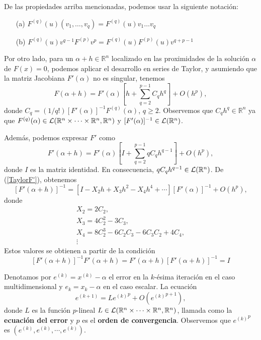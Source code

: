 De las propiedades arriba mencionadas, podemos usar la siguiente notación:
\begin{itemize}
	\item [(a)]  $F^{(q)}(u)(v_1,\ldots,v_{q})=F^{(q)}(u)v_1 \ldots v_{q}$
	\item [(b)]  $F^{(q)}(u)v^{q-1}F^{(p)}v^p=F^{(q)}(u)F^{(p)}(u)v^{q+p-1}$
\end{itemize}

Por otro lado, para un $\alpha+h \in \mathbb{R}^{n}$ localizado en las proximidades de la solución $\alpha$ de $F(x)=0$, podemos aplicar el desarrollo en series de Taylor, y asumiendo que la matriz Jacobiana $F'(\alpha)$ no es singular, tenemos
\begin{equation} \label{taylorconceptosprevios}
F(\alpha+h)=F'(\alpha)\left[h + \sum_{q=2}^{p-1}C_qh^q \right] + O(h^p),
\end{equation}
donde $C_q=(1/q!)[F'(\alpha)]^{-1}F^{(q)}(\alpha)$, $q \geq 2$. Observemos que
$C_qh^q \in \mathbb{R}^{n}$ ya que $F^{(q)}(\alpha) \in {\cal L}(\mathbb{R}^{n} \times
\cdots \times \mathbb{R}^{n}, \mathbb{R}^{n})$ y
$[F'(\alpha)]^{-1} \in {\cal L}(\mathbb{R}^{n})$.

Además, podemos expresar $F'$ como
\begin{equation} \label{TaylorF'}
F'(\alpha+h)=F'(\alpha)\left[I + \sum_{q=2}^{p-1}qC_qh^{q-1} \right] + O(h^p),
\end{equation}
donde $I$ es la matriz identidad. En consecuencia, $qC_qh^{q-1} \in {\cal L}(\mathbb{R}^{n})$.
De (\ref{TaylorF'}), obtenemos
\begin{equation} \label{inverseF'}
[F'(\alpha+h)]^{-1}=\left[I -X_2h+X_3h^2-X_4h^4+ \cdots \right][F'(\alpha)]^{-1} + O(h^p),
\end{equation}
donde
\[
\begin{array} {l}
X_2=2C_2, \\
X_3=4C_2^2-3C_3, \\
X_4=8C_2^3-6C_2C_3-6C_3C_2+4C_4, \\
\vdots
\end{array}
\]
Estos valores se obtienen a partir de la condición
\[
\left[F'(\alpha + h)\right]^{-1}F'(\alpha + h)=F'(\alpha + h)\left[F'(\alpha + h)\right]^{-1}=I
\]

Denotamos por $e^{(k)}=x^{(k)}-\alpha$ el error en la $k$-ésima iteración en el caso multidimensional y $e_k=x_k-\alpha$ en el caso escalar. La ecuación
\[
e^{(k+1)}=L {e^{(k)}}^p+O({e^{(k)}}^{p+1}),
\]
donde $L$ es la función $p$-lineal
$L \in {\cal L}(\mathbb{R}^{n} \times \cdots \times \mathbb{R}^{n}, \mathbb{R}^{n})$, llamada como la \textbf{ecuación del error} y $p$ es el \textbf{orden de convergencia}.
Observemos que ${e^{(k)}}^p$ es $(e^{(k)}, e^{(k)}, \cdots, e^{(k)})$.

